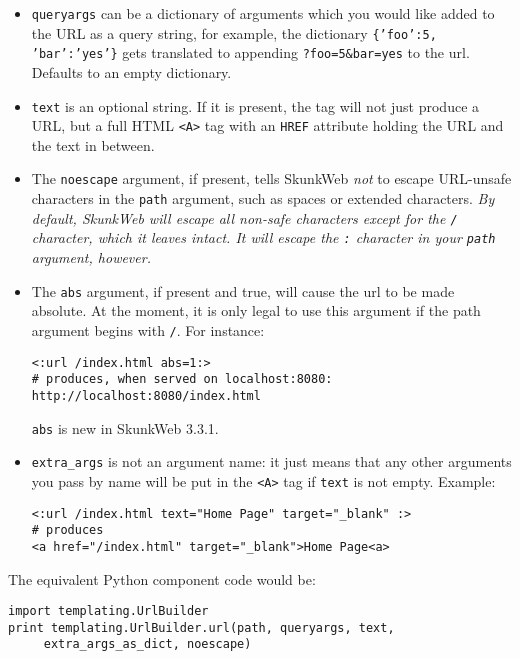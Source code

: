 \documentclass{manual}
\begin{document}
\begin{itemize}
\item \texttt{queryargs} can be a dictionary of arguments which you
would like added to the URL as a query string, for example, the
dictionary \texttt{\{'foo':5, 'bar':'yes'\}} gets translated to
appending \texttt{?foo=5\&bar=yes} to the url. Defaults to an empty
dictionary.

\item \texttt{text} is an optional string. If it is present, the tag
will not just produce a URL, but a full HTML \texttt{<A>}
tag with an \texttt{HREF} attribute holding the URL and the text in
between. 

\item The \texttt{noescape} argument, if present,
tells SkunkWeb \emph{not} to escape URL-unsafe characters in the \texttt{path}
argument, such as spaces or extended characters. \emph{By default,
SkunkWeb will escape all non-safe characters except for the \texttt{/}
character, which it leaves intact. It will escape the \texttt{:}
character in your \texttt{path} argument, however.}

\item The \texttt{abs} argument, if present and true, will cause the
url to be made absolute.  At the moment, it is only legal to use this argument
if the path argument begins with \texttt{/}.  For instance:

\begin{verbatim}<:url /index.html abs=1:>
# produces, when served on localhost:8080:
http://localhost:8080/index.html
\end{verbatim}

\texttt{abs} is new in SkunkWeb 3.3.1.

\item \texttt{extra_args} is not an argument name: it just means 
that any other arguments you pass by name will be put in the
\texttt{<A>} tag if \texttt{text} is not empty. Example:

\begin{verbatim}<:url /index.html text="Home Page" target="_blank" :>
# produces
<a href="/index.html" target="_blank">Home Page<a>
\end{verbatim}

\end{itemize}

The equivalent Python component code would be:
\begin{verbatim}
import templating.UrlBuilder
print templating.UrlBuilder.url(path, queryargs, text,
     extra_args_as_dict, noescape)
\end{verbatim}
\end{document}

